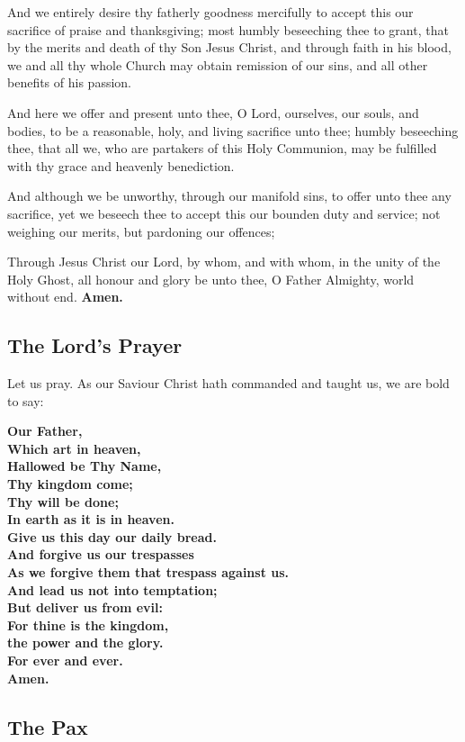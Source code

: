 And we entirely desire thy fatherly goodness mercifully to accept this our
sacrifice of praise and thanksgiving; most humbly beseeching thee to grant,
that by the merits and death of thy Son Jesus Christ, and through faith in his
blood, we and all thy whole Church may obtain remission of our sins, and all
other benefits of his passion.

And here we offer and present unto thee, O Lord, ourselves, our souls, and
bodies, to be a reasonable, holy, and living sacrifice unto thee; humbly
beseeching thee, that all we, who are partakers of this Holy Communion, may
be fulfilled with thy grace and heavenly benediction.

And although we be unworthy, through our manifold sins, to offer unto thee
any sacrifice, yet we beseech thee to accept this our bounden duty and service;
not weighing our merits, but pardoning our offences;

Through Jesus Christ our Lord, by whom, and with whom, in the unity of the
Holy Ghost, all honour and glory be unto thee, O Father Almighty, world
without end. \textbf{Amen.}

\newpage

\subsection{The Lord's Prayer}

Let us pray. As our Saviour Christ hath commanded and taught us, we are bold to say:

\textbf{Our Father,\\
Which art in heaven,\\
Hallowed be Thy Name,\\
Thy kingdom come;\\
Thy will be done;\\
In earth as it is in heaven.\\
Give us this day our daily bread.\\
And forgive us our trespasses\\
As we forgive them that trespass against us.\\
And lead us not into temptation;\\
But deliver us from evil:\\
For thine is the kingdom,\\
the power and the glory.\\
For ever and ever. \\
Amen.}

\subsection{The Pax}

